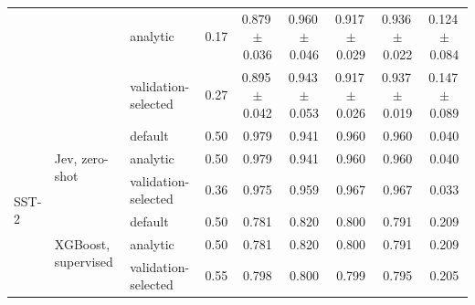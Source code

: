\begin{tabular}{lllcccccc}
 &  & analytic & 0.17 & 0.879\,{\scriptsize$\pm$0.036} & 0.960\,{\scriptsize$\pm$0.046} & 0.917\,{\scriptsize$\pm$0.029} & 0.936\,{\scriptsize$\pm$0.022} & 0.124\,{\scriptsize$\pm$0.084} \\
 &  & validation-selected & 0.27 & 0.895\,{\scriptsize$\pm$0.042} & 0.943\,{\scriptsize$\pm$0.053} & 0.917\,{\scriptsize$\pm$0.026} & 0.937\,{\scriptsize$\pm$0.019} & 0.147\,{\scriptsize$\pm$0.089} \\
\midrule
\multirow{6}{*}{SST-2} & \multirow{3}{*}{Jev, zero-shot} & default & 0.50 & 0.979 & 0.941 & 0.960 & 0.960 & 0.040 \\
 &  & analytic & 0.50 & 0.979 & 0.941 & 0.960 & 0.960 & 0.040 \\
 &  & validation-selected & 0.36 & 0.975 & 0.959 & 0.967 & 0.967 & 0.033 \\
\cmidrule(lr){2-9}
 & \multirow{3}{*}{XGBoost, supervised} & default & 0.50 & 0.781 & 0.820 & 0.800 & 0.791 & 0.209 \\
 &  & analytic & 0.50 & 0.781 & 0.820 & 0.800 & 0.791 & 0.209 \\
 &  & validation-selected & 0.55 & 0.798 & 0.800 & 0.799 & 0.795 & 0.205 \\
\bottomrule
\end{tabular}
